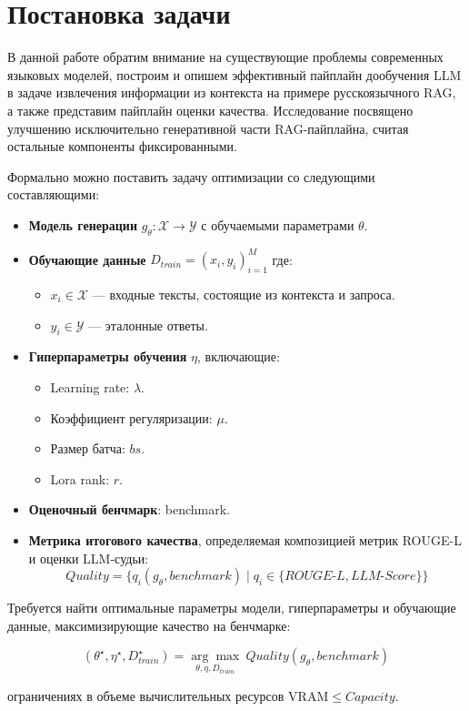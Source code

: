 \section{Постановка задачи}
\label{Problem} 

В данной работе обратим внимание на существующие проблемы современных языковых моделей, построим и опишем эффективный пайплайн дообучения LLM в задаче извлечения информации из контекста на примере русскоязычного RAG, а также представим пайплайн оценки качества. Исследование посвящено улучшению исключительно генеративной части RAG-пайплайна, считая остальные компоненты фиксированными.

Формально можно поставить задачу оптимизации со следующими составляющими:

\begin{itemize}
\item\textbf{Модель генерации} $g_\theta: \mathcal{X} \rightarrow \mathcal{Y}$ с обучаемыми параметрами $\theta$.
\item \textbf{Обучающие данные} $D_{train} = {(x_i, y_i)}_{i=1}^M$ где:
\begin{itemize}
\item $x_i \in \mathcal{X}$ — входные тексты, состоящие из контекста и запроса.
\item $y_i \in \mathcal{Y}$ — эталонные ответы.
\end{itemize}
\item \textbf{Гиперпараметры обучения} $\eta$, включающие:
\begin{itemize}
\item Learning rate: $\lambda$.
\item Коэффициент регуляризации: $\mu$.
\item Размер батча: $bs$.
\item Lora rank: $r$.
\end{itemize}
\item \textbf{Оценочный бенчмарк}: benchmark.
\item \textbf{Метрика итогового качества}, определяемая композицией метрик ROUGE-L и оценки LLM-судьи:
\begin{equation}
    Quality = \{q_i(g_\theta, benchmark) \mid q_i \in \{\textit{ROUGE-L}, \textit{LLM-Score}\}\}
\end{equation}
\end{itemize}

Требуется найти оптимальные параметры модели, гиперпараметры и обучающие данные, максимизирующие качество на бенчмарке:

\begin{equation}
    (\theta^{\star}, \eta^{\star}, D_{train}^{\star}) = \underset{\theta, \eta, D_{train}}{\arg\max}\ Quality(g_\theta, benchmark)
\end{equation}

 ограничениях в объеме вычислительных ресурсов $\text{VRAM}\leq Capacity$.

\newpage
